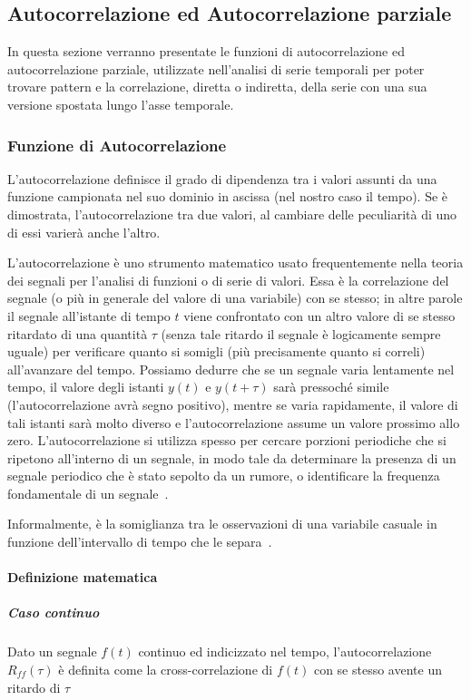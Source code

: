 \subsection{Autocorrelazione ed Autocorrelazione parziale}
In questa sezione verranno presentate le funzioni di autocorrelazione ed autocorrelazione
parziale, utilizzate nell'analisi di serie temporali per poter trovare pattern e la correlazione,
diretta o indiretta, della serie con una sua versione spostata lungo l'asse temporale.


\subsubsection{Funzione di Autocorrelazione}
L'autocorrelazione definisce il grado di dipendenza tra i valori assunti 
da una funzione campionata nel suo dominio in ascissa (nel nostro caso il tempo).
Se è dimostrata, l'autocorrelazione tra due valori, al cambiare delle peculiarità 
di uno di essi varierà anche l'altro.

L'autocorrelazione è uno strumento matematico usato frequentemente nella teoria dei 
segnali per l'analisi di funzioni o di serie di valori. Essa è la correlazione 
del segnale (o più in generale del valore di una variabile) con se stesso; 
in altre parole il segnale all'istante di tempo $t$ viene confrontato con un altro valore 
di se stesso ritardato di una quantità 
$\tau$  (senza tale ritardo il segnale è logicamente sempre uguale) 
per verificare quanto si somigli (più precisamente quanto si correli) 
all'avanzare del tempo. Possiamo dedurre che se un segnale varia lentamente nel tempo, 
il valore degli istanti $y(t)$ e $y(t + \tau)$ sarà pressoché simile 
(l'autocorrelazione avrà segno positivo), mentre se varia rapidamente, 
il valore di tali istanti sarà molto diverso e l'autocorrelazione assume 
un valore prossimo allo zero. 
L'autocorrelazione si utilizza spesso per cercare porzioni periodiche che si ripetono 
all'interno di un segnale, in modo tale da determinare la presenza di un segnale 
periodico che è stato sepolto da un rumore, o identificare la frequenza fondamentale 
di un segnale~\cite{wiki:autcor_it}.

Informalmente, è la somiglianza tra le osservazioni di una variabile casuale 
in funzione dell'intervallo di tempo che le separa~\cite{wiki:autcor_en}.

\paragraph{Definizione matematica} 
\subparagraph*{Caso continuo}
\begin{sloppypar}
Dato un segnale $f(t)$ continuo ed indicizzato nel tempo, l'autocorrelazione $R_{ff}(\tau)$
è definita come la cross-correlazione di $f(t)$ con se stesso avente un ritardo di $\tau$
\end{sloppypar}

